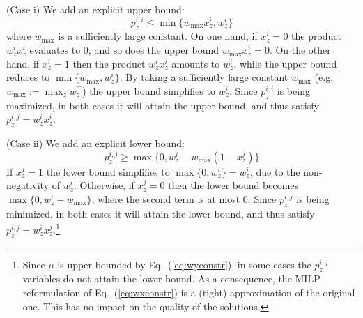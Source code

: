 \documentclass{article}
\renewcommand\[{\begin{equation}}
\renewcommand\]{\end{equation}}
\begin{document}
(Case i) We add an explicit upper bound:
%
$$ p^{i,i}_z \le \min \{ w_\text{max} x^{i}_z, w^{i}_z \} $$
%
where $w_\text{max}$ is a sufficiently large constant.
On one hand, if $x^i_z = 0$ the product $w^i_z x^i_z$ evaluates to $0$, and so does
the upper bound $w_\text{max} x^{i}_z = 0$. On the other hand, if $x^i_z=1$
then the product $w^i_z x^i_z$ amounts to $w^i_z$, while the upper
bound reduces to $\min \{ w_\text{max}, w^{i}_z \}$. By taking a sufficiently
large constant $w_\text{max}$ (e.g. $w_\text{max} := \max_z w^\top_z$) the
upper bound simplifies to $w^i_z$. Since $p^{i,i}_z$ is being maximized, in
both cases it will attain the upper bound, and thus satisfy $p^{i,j}_z = w^i_z x^i_z$.

(Case ii) We add an explicit lower bound:
%
$$ p^{i,j}_z \ge \max \{ 0, w^{i}_z - w_\text{max}(1 - x^{j}_z) \} $$
%
If $x^j_z = 1$ the lower bound simplifies to $\max \{ 0, w^{i}_z \} = w^{i}_z$,
due to the non-negativity of $w^i_z$. Otherwise, if $x^j_z = 0$
then the lower bound becomes $\max \{ 0, w^{i}_z - w_\text{max} \}$, where
the second term is at most $0$. Since $p^{i,j}_z$ is being minimized, in both
cases it will attain the lower bound, and thus satisfy $p^{i,j}_z = w^i_z
x^j_z$.\footnote{Since $\mu$ is upper-bounded by Eq.~(\ref{eq:wyconstr}), in some
cases the $p^{i,j}_z$ variables do not attain the lower bound. As a
consequence, the MILP reformulation of Eq.~(\ref{eq:wxconstr}) is a (tight)
approximation of the original one. This has no impact on the quality of the
solutions.}
\end{document}
